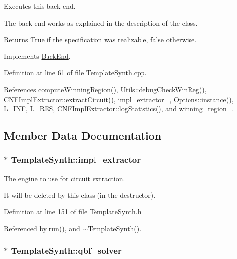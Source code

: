 Executes this back-\/end. 

The back-\/end works as explained in the description of the class.

\begin{DoxyReturn}{Returns}
True if the specification was realizable, false otherwise. 
\end{DoxyReturn}


Implements \hyperlink{classBackEnd_a099e717dc71e9cc2d838b1ca86340590}{Back\-End}.



Definition at line 61 of file Template\-Synth.\-cpp.



References compute\-Winning\-Region(), Utils\-::debug\-Check\-Win\-Reg(), C\-N\-F\-Impl\-Extractor\-::extract\-Circuit(), impl\-\_\-extractor\-\_\-, Options\-::instance(), L\-\_\-\-I\-N\-F, L\-\_\-\-R\-E\-S, C\-N\-F\-Impl\-Extractor\-::log\-Statistics(), and winning\-\_\-region\-\_\-.



\subsection{Member Data Documentation}
\hypertarget{classTemplateSynth_acfa25deb001fb3b6d49c0261bba98347}{
\subsubsection[{impl\-\_\-extractor\-\_\-}]{$\ast$ Template\-Synth\-::impl\-\_\-extractor\-\_\-\hspace{0.3cm}{\ttfamily [protected]}}}\label{classTemplateSynth_acfa25deb001fb3b6d49c0261bba98347}


The engine to use for circuit extraction. 

It will be deleted by this class (in the destructor). 

Definition at line 151 of file Template\-Synth.\-h.



Referenced by run(), and $\sim$\-Template\-Synth().

\hypertarget{classTemplateSynth_a08ec20197bf16a10546a7e6cf3719727}{
\subsubsection[{qbf\-\_\-solver\-\_\-}]{$\ast$ Template\-Synth\-::qbf\-\_\-solver\-\_\-\hspace{0.3cm}{\ttfamily [protected]}}}\label{classTemplateSynth_a08ec20197bf16a10546a7e6cf3719727}


